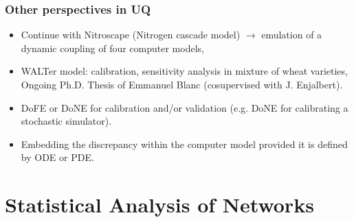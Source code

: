 \documentclass[nopagenumber,9pt]{beamer}
\begin{document}
%
%


\begin{frame}
 \frametitle{Other perspectives in UQ}

 \begin{itemize}
  \item Continue with Nitroscape (Nitrogen cascade model) \cite{ferrer} $\rightarrow$ emulation of  a dynamic coupling of four computer models,

  \smallskip
  \item WALTer model: calibration, sensitivity analysis in mixture of wheat varieties, Ongoing Ph.D. Thesis of Emmanuel Blanc (cosupervised with J. Enjalbert).

  \smallskip
%
  \item DoFE or DoNE for calibration and/or validation (e.g. DoNE for calibrating a stochastic simulator).

  \smallskip
  \item Embedding the discrepancy within the computer model provided it is defined by ODE or PDE.


 \end{itemize}


%
\end{frame}








\section{Statistical Analysis of Networks}
\end{document}
